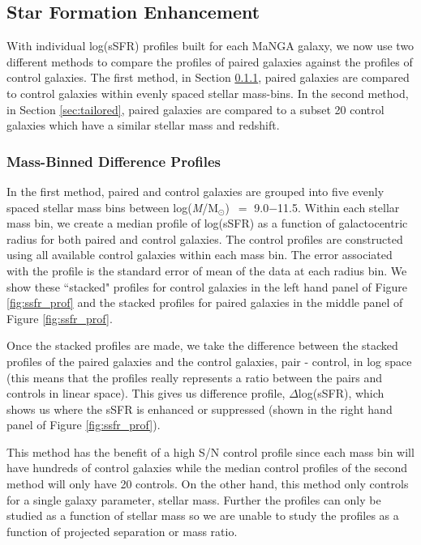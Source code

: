 \documentclass[iop,revtex4,twocolumn,apj,numberedappendix,appendixfloats]{emulateapj}
\newcommand{\logm}{log({\it M}/M$_{\odot}$)}
\begin{document}
\subsection{Star Formation Enhancement}

With individual log(sSFR) profiles built for each MaNGA galaxy, we now use two different methods to compare the profiles of paired galaxies against the profiles of control galaxies. The first method, in Section \ref{sec:mass-bin}, paired galaxies are compared to control galaxies within evenly spaced stellar mass-bins. In the second method, in Section \ref{sec:tailored}, paired galaxies are compared to a subset 20 control galaxies which have a similar stellar mass and redshift. 

\subsubsection{Mass-Binned Difference Profiles}\label{sec:mass-bin}

In the first method, paired and control galaxies are grouped into five evenly spaced stellar mass bins between \logm\ $=$ 9.0$-$11.5. Within each stellar mass bin, we create a median profile of log(sSFR) as a function of galactocentric radius for both paired and control galaxies. The control profiles are constructed using all available control galaxies within each mass bin. The error associated with the profile is the standard error of mean of the data at each radius bin. We show these ``stacked" profiles for control galaxies in the left hand panel of Figure \ref{fig:ssfr_prof} and the stacked profiles for paired galaxies in the middle panel of Figure \ref{fig:ssfr_prof}.

Once the stacked profiles are made, we take the difference between the stacked profiles of the paired galaxies and the control galaxies, pair - control, in log space (this means that the profiles really represents a ratio between the pairs and controls in linear space). This gives us difference profile, $\Delta$log(sSFR), which shows us where the sSFR is enhanced or suppressed (shown in the right hand panel of Figure \ref{fig:ssfr_prof}). 

This method has the benefit of a high S/N control profile since each mass bin will have hundreds of control galaxies while the median control profiles of the second method will only have 20 controls. On the other hand, this method only controls for a single galaxy parameter, stellar mass. Further the profiles can only be studied as a function of stellar mass so we are unable to study the profiles as a function of projected separation or mass ratio. 
\end{document}
